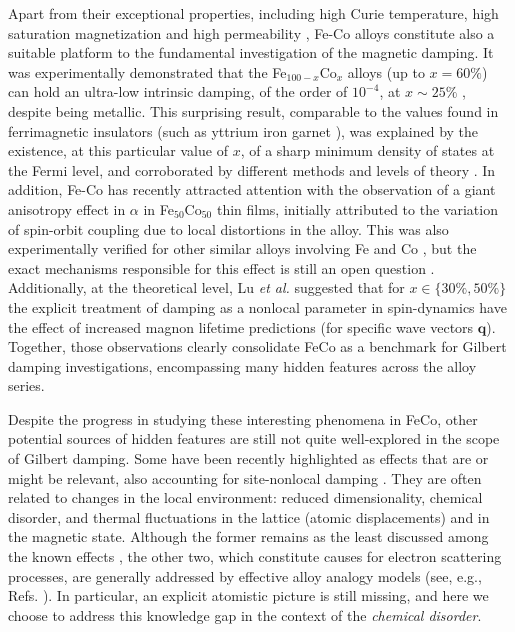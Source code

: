 Apart from their exceptional properties, including high Curie temperature, high saturation magnetization and high permeability \cite{sundar2005soft}, Fe-Co alloys constitute also a suitable platform to the fundamental investigation of the magnetic damping. It was experimentally demonstrated that the Fe$_{100-x}$Co$_x$ alloys (up to $x=60\%$) can hold an ultra-low intrinsic damping, of the order of $10^{-4}$, at $x\sim25\%$ \cite{schoen2016ultra}, despite being metallic. This surprising result, comparable to the values found in ferrimagnetic insulators (such as yttrium iron garnet \cite{Kajiwara2010}), was explained by the existence, at this particular value of $x$, of a sharp minimum density of states at the Fermi level, and corroborated by different methods and levels of theory \cite{PhysRevLett.107.066603, PhysRevB.87.014430, PhysRevB.98.104406, PhysRevB.108.014433, PhysRevB.98.174412, PhysRevB.92.214407}. In addition, Fe-Co has recently attracted attention with the observation of a giant anisotropy effect in $\alpha$ \cite{PhysRevLett.122.117203} in Fe$_{50}$Co$_{50}$ thin films, initially attributed to the variation of spin-orbit coupling due to local distortions in the alloy. This was also experimentally verified for other similar alloys involving Fe and Co \cite{PhysRevApplied.19.024030,Wang2023}, but the exact mechanisms responsible for this effect is still an open question \cite{PhysRevB.103.L220405,PhysRevB.103.L220403,PhysRevApplied.19.024030,PhysRevLett.131.186703}. Additionally, at the theoretical level, Lu \textit{et al.} \cite{PhysRevB.108.014433} suggested that for $x\in\{30\%,50\%\}$ the explicit treatment of damping as a nonlocal parameter in spin-dynamics have the effect of increased magnon lifetime predictions (for specific wave vectors $\mathbf{q}$). Together, those observations clearly consolidate FeCo as a benchmark for Gilbert damping investigations, encompassing many hidden features across the alloy series.

Despite the progress in studying these interesting phenomena in FeCo, other potential sources of hidden features are still not quite well-explored in the scope of Gilbert damping. Some have been recently highlighted as effects that are or might be relevant, also accounting for site-nonlocal damping  \cite{PhysRevB.109.094417,PhysRevB.103.L220405}. They are often related to changes in the local environment: reduced dimensionality, chemical disorder, and thermal fluctuations in the lattice (atomic displacements) and in the magnetic state. Although the former remains as the least discussed among the known effects \cite{PhysRevB.109.094417}, the other two, which constitute causes for electron scattering processes, are generally addressed by effective alloy analogy models (see, e.g., Refs. \cite{PhysRevB.91.165132,PhysRevLett.107.066603}). In particular, an explicit atomistic picture is still missing, and here we choose to address this knowledge gap in the context of the \textit{chemical disorder}. 

